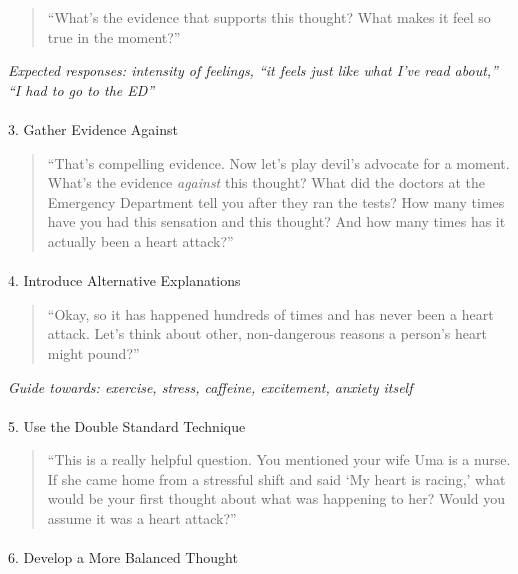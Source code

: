 \documentclass[
  american,
  11pt,
  11pt,
  letterpaper,
  onecolumn]{article}
\makeatletter
\let\oldparagraph\paragraph
\renewcommand{\paragraph}{
    \@ifstar
      \xxxParagraphStar
      \xxxParagraphNoStar
  }
\newcommand{\xxxParagraphStar}[1]{\oldparagraph*{#1}\mbox{}}
\newcommand{\xxxParagraphNoStar}[1]{\oldparagraph{#1}\mbox{}}
\makeatother
\begin{document}
\begin{quote}
``What's the evidence that supports this thought? What makes it feel so
true in the moment?''
\end{quote}

\emph{Expected responses: intensity of feelings, ``it feels just like
what I've read about,'' ``I had to go to the ED''}

\paragraph{3. Gather Evidence Against}\label{gather-evidence-against}

\begin{quote}
``That's compelling evidence. Now let's play devil's advocate for a
moment. What's the evidence \emph{against} this thought? What did the
doctors at the Emergency Department tell you after they ran the tests?
How many times have you had this sensation and this thought? And how
many times has it actually been a heart attack?''
\end{quote}

\paragraph{4. Introduce Alternative
Explanations}\label{introduce-alternative-explanations}

\begin{quote}
``Okay, so it has happened hundreds of times and has never been a heart
attack. Let's think about other, non-dangerous reasons a person's heart
might pound?''
\end{quote}

\emph{Guide towards: exercise, stress, caffeine, excitement, anxiety
itself}

\paragraph{5. Use the Double Standard
Technique}\label{use-the-double-standard-technique}

\begin{quote}
``This is a really helpful question. You mentioned your wife Uma is a
nurse. If she came home from a stressful shift and said `My heart is
racing,' what would be your first thought about what was happening to
her? Would you assume it was a heart attack?''
\end{quote}

\paragraph{6. Develop a More Balanced
Thought}\label{develop-a-more-balanced-thought}
\end{document}
